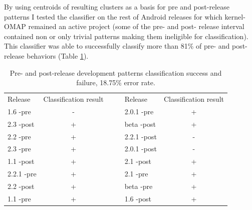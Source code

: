 \documentclass[10pt, conference, compsocconf]{IEEEtran}
\begin{document}
By using centroids of resulting clusters as a basis for pre and post-release patterns I tested 
the classifier on the rest of Android releases for which kernel-OMAP remained an active project
(some of the pre- and post- release interval contained non or only trivial patterns making them
ineligible for classification). This classifier was able to successfully classify more than 81\% 
of pre- and post-release behaviors (Table \ref{tab:success}).

\begin{table}
  \caption{Pre- and post-release development patterns classification success and failure, 18.75\% error rate.}
  \centering
  \label{tab:success}
  \begin{tabular}{ | l | c | c c | l | c |}
  \cline{1-2} \cline{5-6}
  Release & Classification result& & & Release & Classification result\\
  \cline{1-2} \cline{5-6}
1.6 -pre & - & & & 2.0.1 -pre & + \\ 
2.3 -post & + & & & beta -post & + \\
2.2 -pre & + & & & 2.2.1 -post & - \\
2.3 -pre & + & & & 2.0.1 -post & -\\
1.1 -post & + & & & 2.1 -post & + \\
2.2.1 -pre & + & & & 2.1 -pre & + \\
2.2 -post & + & & & beta -pre & + \\
1.1 -pre & + & & & 1.6 -post & + \\
  \cline{1-2} \cline{5-6}
  \end{tabular}
\end{table}

%
%
\end{document}
